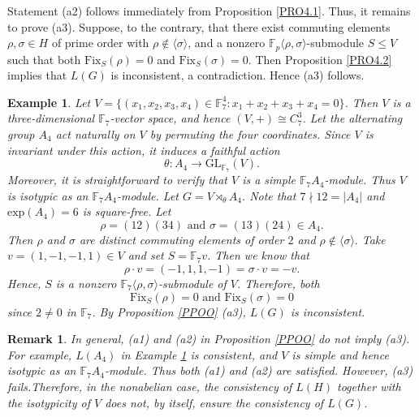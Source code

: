 \documentclass[12pt]{article}
\newtheorem{remark}{\bf Remark}[section]
\newtheorem{example}{\bf Example}[section]
\def\QEDopen{{\setlength{\fboxsep}{0pt}\setlength{\fboxrule}{0.2pt}\fbox{\rule[0pt]{0pt}{1.3ex}\rule[0pt]{1.3ex}{0pt}}}}
\def\QED{\QEDopen}
\def\endproof{\hspace*{\fill}~\QED\par\endtrivlist\unskip}
\begin{document}
Statement (a2) follows immediately from Proposition \ref{PRO4.1}. Thus, it remains to prove (a3). Suppose, to the contrary, that there exist
commuting elements $\rho,\sigma\in H$ of prime order with $\rho\notin\langle\sigma\rangle$,
and a nonzero $\mathbb F_p\langle\rho,\sigma\rangle$-submodule $S\leq V$ 
such that both $\mbox{Fix}_{S}(\rho)=0$ and $\mbox{Fix}_{S}(\sigma)=0$. 
Then Proposition \ref{PRO4.2} implies that $L(G)$ is inconsistent, a contradiction. Hence (a3) follows.
\endproof
\begin{example}\label{EX++}
\emph{Let $V=\{(x_1, x_2, x_3, x_4)\in \mathbb{F}^{4}_{7}: x_1+x_2+x_3+x_4=0\}$. Then $V$ is a three-dimensional $\mathbb{F}_7$-vector space, and hence $(V, +)\cong C^3_{7}$. Let the alternating group $A_4$ act naturally on $V$ by permuting the four coordinates. Since $V$ is invariant under this action, it induces a faithful action $$\theta: A_4\longrightarrow \mbox{GL}_{\mathbb{F}_{7}}(V).$$
Moreover, it is straightforward to verify that $V$ is a simple
$\mathbb{F}_{7}A_4$-module. Thus $V$ is isotypic as an $\mathbb{F}_{7}A_4$-module. Let $G=V\rtimes_\theta A_4$. Note that $7\nmid 12=|A_4|$ and $\mbox{exp}(A_4)=6$ is square-free. 
Let $$\rho=(12)(34)\mbox{ and } \sigma=(13)(24)\in A_4.$$ 
Then $\rho$ and $\sigma$ are distinct commuting elements of order $2$ and $\rho\notin \langle\sigma\rangle.$ 
Take $v=(1,-1,-1,1)\in V$ and set $S=\mathbb{F}_{7}v$. 
Then we know that $$\rho\cdot v=(-1,1,1,-1)=\sigma\cdot v=-v.$$ 
Hence, $S$ is a nonzero $\mathbb{F}_7\langle \rho, \sigma\rangle$-submodule of $V$. Therefore, both $$\mbox{Fix}_{S}(\rho)=0 \mbox{ and } \mbox{Fix}_{S}(\sigma)=0$$ since $2\neq 0$ in $\mathbb{F}_7$. By Proposition \ref{PPOO} (a3), $L(G)$ is inconsistent.}    
\end{example}

\begin{remark}\label{OORE}
\emph{In general, (a1) and (a2) in Proposition \ref{PPOO} do not imply (a3). For example, $L(A_4)$ in Example \ref{EX++} is consistent, and $V$ is simple and hence isotypic as an $\mathbb F_7A_4$-module. Thus both (a1) and (a2) are satisfied. However, (a3) fails.Therefore, in the nonabelian case, the consistency of $L(H)$ together with the isotypicity of $V$ does not, by itself, ensure the consistency of $L(G)$.  }
\end{remark}
\end{document}

